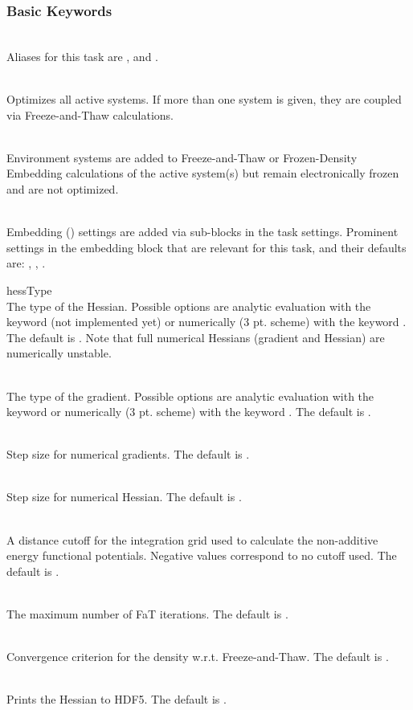 \subsubsection{Basic Keywords}
\begin{description}
\item [\texttt{name}]\hfill \\
 Aliases for this task are ,  and .
\item [\texttt{activeSystems}]\hfill \\
 Optimizes all active systems. If more than one system is given, they are coupled via Freeze-and-Thaw calculations.
\item [\texttt{environmentSystems}]\hfill \\
 Environment systems are added to Freeze-and-Thaw or Frozen-Density Embedding calculations of the active system(s) but remain electronically frozen and are not optimized.
\item [\texttt{sub-blocks}]\hfill \\
 Embedding () settings are added via sub-blocks in the task settings.
 Prominent settings in the embedding block that are relevant for this task, and their defaults are:
 , , .
\item{hessType}\hfill \\
 The type of the Hessian. Possible options are analytic evaluation with the keyword  (not implemented yet) or numerically (3 pt. scheme) with the keyword . The default is . Note that full numerical Hessians (gradient and Hessian) are numerically unstable. 
\item [\texttt{gradType}]\hfill \\
 The type of the gradient. Possible options are analytic evaluation with the keyword  or numerically (3 pt. scheme) with the keyword . The default is . 
\item [\texttt{numGradStepSize}]\hfill \\
 Step size for numerical gradients. The default is . 
\item [\texttt{numHessStepSize}]\hfill \\
 Step size for numerical Hessian. The default is . 
\item [\texttt{FaTgridCutOff}]\hfill \\
  A distance cutoff for the integration grid used to calculate the non-additive energy functional potentials. Negative values correspond to no cutoff used. The default is .
\item [\texttt{FaTmaxCycles}]\hfill \\
  The maximum number of FaT iterations. The default is .
\item [\texttt{FaTenergyConvThresh}]\hfill \\
  Convergence criterion for the density w.r.t. Freeze-and-Thaw. The default is .
\item [\texttt{printToFile}]\hfill \\
  Prints the Hessian to HDF5. The default is .
\end{description}
